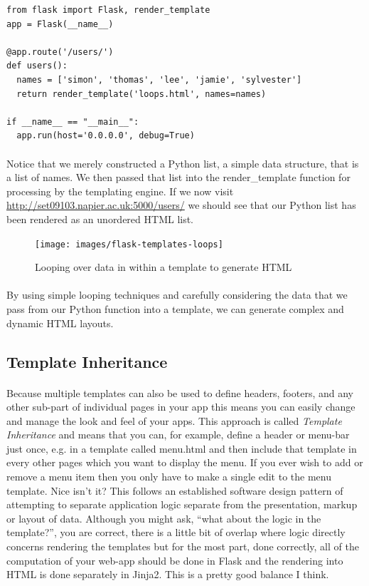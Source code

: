 \documentclass[12pt, a4paper, oneside]{book}
\begin{document}
{\begin{lstlisting}
from flask import Flask, render_template
app = Flask(__name__)

@app.route('/users/')
def users():
  names = ['simon', 'thomas', 'lee', 'jamie', 'sylvester']
  return render_template('loops.html', names=names)

if __name__ == "__main__":
  app.run(host='0.0.0.0', debug=True)
\end{lstlisting}

\paragraph{} Notice that we merely constructed a Python list, a simple data structure, that is a list of names. We then passed that list into the render\_template function for processing by the templating engine. If we now visit \url{http://set09103.napier.ac.uk:5000/users/} we should see that our Python list has been rendered as an unordered HTML list.

\begin{figure}[H]
\centering
\texttt{[image: images/flask-templates-loops]}
\caption{Looping over data in within a template to generate HTML}
\label{fig:flask-templates-loops}
\end{figure}

\paragraph{} By using simple looping techniques and carefully considering the data that we pass from our Python function into a template, we can generate complex and dynamic HTML layouts.


\subsection{Template Inheritance}
\label{template-inheritance}
\paragraph{} Because multiple templates can also be used to define headers, footers, and any other sub-part of individual pages in your app this means you can easily change and manage the look and feel of your apps. This approach is called \emph{Template Inheritance} and means that you can, for example, define a header or menu-bar just once, e.g. in a template called menu.html and then include that template in every other pages which you want to display the menu. If you ever wish to add or remove a menu item then you only have to make a single edit to the menu template. Nice isn't it? This follows an established software design pattern of attempting to separate application logic separate from the presentation, markup or layout of data. Although you might ask, ``what about the logic in the template?'', you are correct, there is a little bit of overlap where logic directly concerns rendering the templates but for the most part, done correctly, all of the computation of your web-app should be done in Flask and the rendering into HTML is done separately in Jinja2. This is a pretty good balance I think.

}
\end{document}
